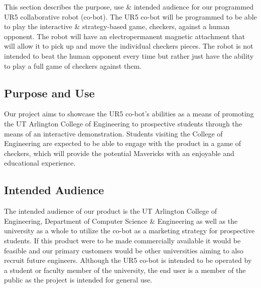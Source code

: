 
This section describes the purpose, use \& intended audience for our programmed UR5 collaborative robot (co-bot). The UR5 co-bot will be programmed to be able to play the interactive \& strategy-based game, checkers, against a human opponent. The robot will have an electropermanent magnetic attachment that will allow it to pick up and move the individual checkers pieces. The robot is not intended to beat the human opponent every time but rather just have the ability to play a full game of checkers against them.

\subsection{Purpose and Use}

Our project aims to showcase the UR5 co-bot's abilities as a means of promoting the UT Arlington College of Engineering to prospective students through the means of an interactive demonstration. Students visiting the College of Engineering are expected to be able to engage with the product in a game of checkers, which will provide the potential Mavericks with an enjoyable and educational experience.

\subsection{Intended Audience}

The intended audience of our product is the UT Arlington College of Engineering, Department of Computer Science \& Engineering as well as the university as a whole to utilize the co-bot as a marketing strategy for prospective students. If this product were to be made commercially available it would be feasible and our primary customers would be other universities aiming to also recruit future engineers. Although the UR5 co-bot is intended to be operated by a student or faculty member of the university, the end user is a member of the public as the project is intended for general use.

